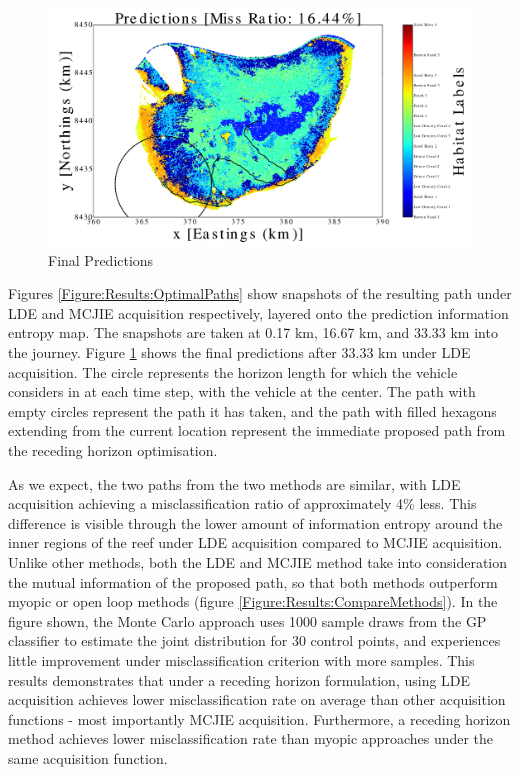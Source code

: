 \documentclass{article}
\begin{document}
		\begin{figure}[!htbp]
		\centering
			\includegraphics[width = \linewidth]{Figures/informative_seafloor_exploration/lde/pred200-eps-converted-to.png}
		\caption{Final Predictions}
		\label{Figure:Results:FinalPredictions}
		\end{figure}
				
		Figures \ref{Figure:Results:OptimalPaths} show snapshots of the resulting path under LDE and MCJIE acquisition respectively, layered onto the prediction information entropy map. The snapshots are taken at 0.17 km, 16.67 km, and 33.33 km into the journey. Figure \ref{Figure:Results:FinalPredictions} shows the final predictions after 33.33 km under LDE acquisition. The circle represents the horizon length for which the vehicle considers in at each time step, with the vehicle at the center. The path with empty circles represent the path it has taken, and the path with filled hexagons extending from the current location represent the immediate proposed path from the receding horizon optimisation.
		
		As we expect, the two paths from the two methods are similar, with LDE acquisition achieving a misclassification ratio of approximately 4\% less. This difference is visible through the lower amount of information entropy around the inner regions of the reef under LDE acquisition compared to MCJIE acquisition. Unlike other methods, both the LDE and MCJIE method take into consideration the mutual information of the proposed path, so that both methods outperform myopic or open loop methods (figure \ref{Figure:Results:CompareMethods}). In the figure shown, the Monte Carlo approach uses 1000 sample draws from the GP classifier to estimate the joint distribution for 30 control points, and experiences little improvement under misclassification criterion with more samples. This results demonstrates that under a receding horizon formulation, using LDE acquisition achieves lower misclassification rate on average than other acquisition functions - most importantly MCJIE acquisition. Furthermore, a receding horizon method achieves lower misclassification rate than myopic approaches under the same acquisition function.	
\end{document}
